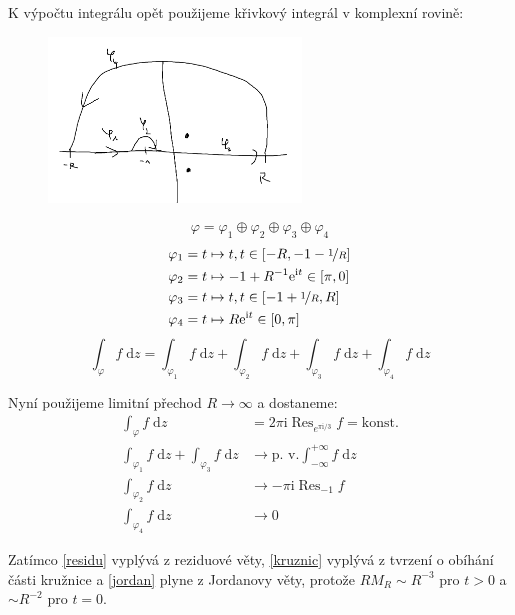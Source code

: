 \documentclass[10pt,a4paper]{article}
\newcommand{\const}[1]{\text{#1}}
\newcommand{\Res}{\operatorname{Res}}
\renewcommand{\d}[1]{\;\const{d}#1}
\newcommand{\e}[1]{\const{e}^{#1}}
\renewcommand{\i}{\const{i}}
\begin{document}
K výpočtu integrálu opět použijeme křivkový integrál v komplexní rovině:

\begin{figure}[H]
    \centering
    \includegraphics[width=0.6\textwidth]{du2_2.PNG}
    \label{obr:du2u2param}
\end{figure}
\begin{equation*}
    \varphi = \varphi_1 \oplus \varphi_2 \oplus \varphi_3 \oplus \varphi_4
\end{equation*}
\begin{align*}
    \varphi_1 &= t \mapsto t, t \in [-R, -1 - \nicefrac{1}{R}] \\
    \varphi_2 &= t \mapsto -1 + R^{-1} \e{\i t} \in [\pi, 0] \\
    \varphi_3 &= t \mapsto t, t \in [-1+\nicefrac{1}{R}, R] \\
    \varphi_4 &= t \mapsto R \e{\i t} \in [0, \pi]
\end{align*}
\begin{equation*}
    \int_\varphi f \d{z}
    = \int_{\varphi_1} f \d{z}
    + \int_{\varphi_2} f \d{z}
    + \int_{\varphi_3} f \d{z}
    + \int_{\varphi_4} f \d{z}
\end{equation*}

Nyní použijeme limitní přechod $R\to\infty$ a dostaneme:
\begin{align}
    \int_\varphi f \d{z}
    &= 2\pi\i \Res_{e^{\pi\i/3}} f = \const{konst.}
    \label{residu}
    \\[5pt]
    \int_{\varphi_1} f \d{z} + \int_{\varphi_3} f \d{z}
    &\to \const{p. v.} \int_{-\infty}^{+\infty} f \d{z}
    \\[5pt]
    \int_{\varphi_2} f \d{z} &\to -\pi\i \Res_{-1} f
    \label{kruznic}
    \\[5pt]
    \int_{\varphi_4} f \d{z} &\to 0
    \label{jordan}
\end{align}

Zatímco \eqref{residu} vyplývá z reziduové věty, \eqref{kruznic} vyplývá z tvrzení o obíhání části kružnice a \eqref{jordan} plyne z Jordanovy věty, protože $RM_R \sim R^{-3}$ pro $t>0$ a $\sim R^{-2}$ pro $t = 0$.
\end{document}
